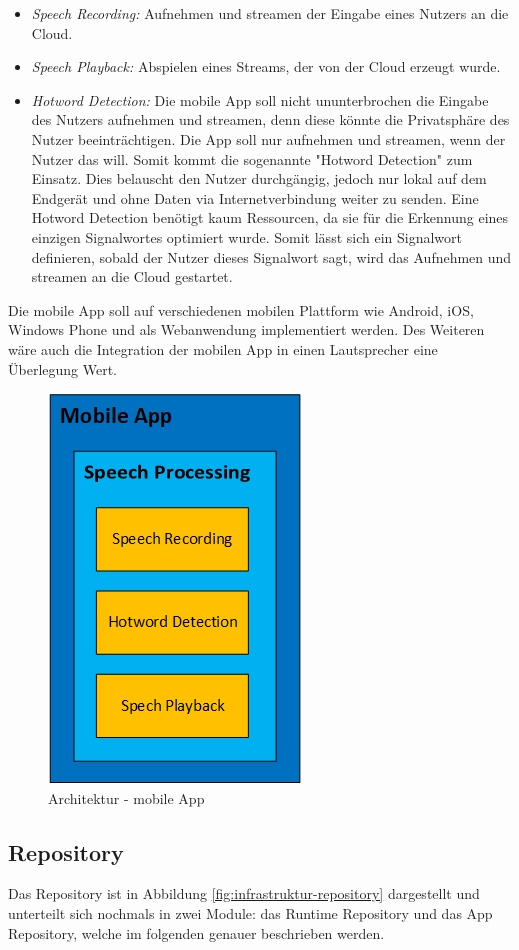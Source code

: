 \begin{itemize}
	\item \textsl{Speech Recording:} Aufnehmen und streamen der Eingabe eines Nutzers an die Cloud.
	\item \textsl{Speech Playback:} Abspielen eines Streams, der von der Cloud erzeugt wurde.
	\item \textsl{Hotword Detection:} Die mobile App soll nicht ununterbrochen die Eingabe des Nutzers aufnehmen und streamen, denn diese könnte die Privatsphäre des Nutzer beeinträchtigen. Die App soll nur aufnehmen und streamen, wenn der Nutzer das will. Somit kommt die sogenannte "Hotword Detection" zum Einsatz. Dies belauscht den Nutzer durchgängig, jedoch nur lokal auf dem Endgerät und ohne Daten via Internetverbindung weiter zu senden. Eine Hotword Detection benötigt kaum Ressourcen, da sie für die Erkennung eines einzigen Signalwortes optimiert wurde. Somit lässt sich ein Signalwort definieren, sobald der Nutzer dieses Signalwort sagt, wird das Aufnehmen und streamen an die Cloud gestartet.
\end{itemize}

Die mobile App soll auf verschiedenen mobilen Plattform wie Android, iOS, Windows Phone und als Webanwendung implementiert werden. Des Weiteren wäre auch die Integration der mobilen App in einen Lautsprecher eine Überlegung Wert.

\begin{figure}[h!]
	\centering
	\includegraphics[width=0.3\linewidth]{Picture/Infrastruktur-App.jpg}
	\caption[Architektur - mobile App]{Architektur - mobile App}
	\label{fig:infrastruktur-app}
\end{figure}

\subsection{Repository}
Das Repository ist in Abbildung \ref{fig:infrastruktur-repository} dargestellt und unterteilt sich nochmals in zwei Module: das Runtime Repository und das App Repository, welche im folgenden genauer beschrieben werden.

